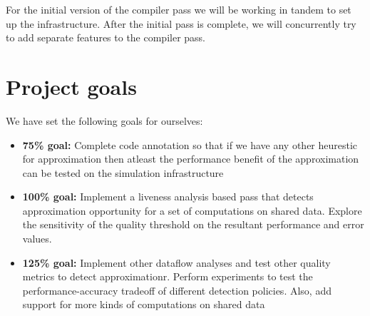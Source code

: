 \documentclass[12pt,conference]{IEEEtran}
\begin{document}
For the initial version of the compiler pass we will be working in tandem to 
set up the infrastructure. After the initial pass is complete, we will
concurrently try to add separate features to the compiler pass.

\section{Project goals}

We have set the following goals for ourselves:

\begin{itemize}

\item \textbf{75\% goal:} Complete code annotation so that if we have any other heurestic
 for approximation then atleast the  performance benefit of the approximation can be tested on the simulation infrastructure
\item \textbf{100\% goal:} Implement a liveness analysis based pass that detects approximation opportunity for a set of computations on shared data. Explore the sensitivity of the quality threshold on the resultant performance and error values.
\item \textbf{125\% goal:} Implement other dataflow analyses and test other quality metrics to detect approximationr. Perform experiments to test the performance-accuracy tradeoff of different detection policies. Also, add support for more kinds of computations on shared data

\end{itemize}





%
%
\end{document}
